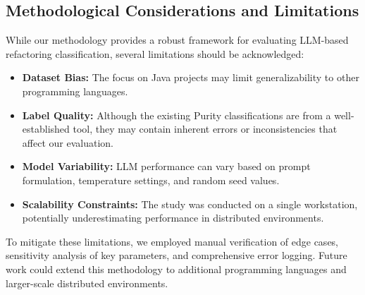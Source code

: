 \subsection{Methodological Considerations and Limitations}

While our methodology provides a robust framework for evaluating LLM-based refactoring classification, several limitations should be acknowledged:

\begin{itemize}
    \item \textbf{Dataset Bias:} The focus on Java projects may limit generalizability to other programming languages.
    \item \textbf{Label Quality:} Although the existing Purity classifications are from a well-established tool, they may contain inherent errors or inconsistencies that affect our evaluation.
    \item \textbf{Model Variability:} LLM performance can vary based on prompt formulation, temperature settings, and random seed values.
    \item \textbf{Scalability Constraints:} The study was conducted on a single workstation, potentially underestimating performance in distributed environments.
\end{itemize}

To mitigate these limitations, we employed manual verification of edge cases, sensitivity analysis of key parameters, and comprehensive error logging. Future work could extend this methodology to additional programming languages and larger-scale distributed environments.
